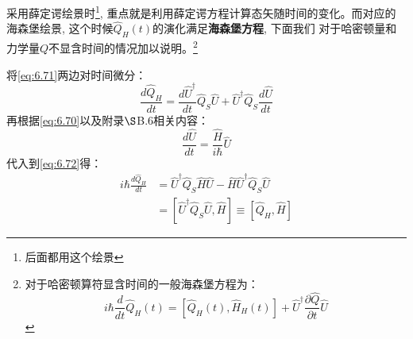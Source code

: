 \documentclass[a4paper,zihao=-4,linespread=1]{ctexrep}
\begin{document}
    采用薛定谔绘景时\footnote{后面都用这个绘景}, 重点就是利用薛定谔方程计算态矢随时间的变化。而对应的海森堡绘景, 这个时候$\hat{Q}_H(t)$的演化满足\textbf{海森堡方程}, 下面我们
    对于哈密顿量和力学量$Q$不显含时间的情况加以说明。\footnote{对于哈密顿算符显含时间的一般海森堡方程为：\[i \hbar \frac{d}{d t} \hat{Q}_{H}(t)=\left[\hat{Q}_{H}(t), \hat{H}_{H}(t)\right]+\hat{U}^{\dagger} \frac{\partial \hat{Q}}{\partial t} \hat{U}\]}

    将\ref{eq:6.71}两边对时间微分：
    \begin{equation}
        \label{eq:6.72}
        \frac{d\hat{Q}_H}{dt}=\frac{d\hat{U}^\dagger}{dt}\hat{Q}_S\hat{U}+\hat{U}^\dagger\hat{Q}_S\frac{d\hat{U}}{dt}
    \end{equation}
    再根据\ref{eq:6.70}以及附录$\S$B.6相关内容：
    \begin{equation}
        \frac{d\hat{U}}{dt}=\frac{\hat{H}}{i\hbar}\hat{U}
    \end{equation}
    代入到\ref{eq:6.72}得：
    \begin{align*}
        i\hbar\frac{d\hat{Q}_H}{dt}&=\hat{U}^\dagger\hat{Q}_S\hat{H}\hat{U}-\hat{H}\hat{U}^\dagger\hat{Q}_S\hat{U}\\
        &=\left[\hat{U}^\dagger\hat{Q}_S\hat{U},\hat{H}\right]\equiv\left[\hat{Q}_H,\hat{H}\right]
    \end{align*}
\end{document}
